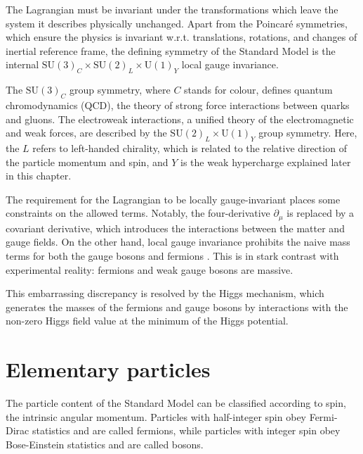 The Lagrangian must be invariant under the transformations which leave the
system it describes physically unchanged. Apart from the Poincar\'e symmetries, which
ensure the physics is invariant w.r.t. translations, rotations, and changes of inertial
reference frame, the defining symmetry of the Standard Model is the internal
$\text{SU}(3)_C \times \text{SU}(2)_L \times \text{U}(1)_Y$ local gauge invariance.

The $\text{SU}(3)_C$ group symmetry, where $C$ stands for colour, defines quantum chromodynamics
(QCD), the theory of strong force interactions between quarks and gluons. The electroweak
interactions, a unified theory of the electromagnetic and weak forces, are described by
the $\text{SU}(2)_L \times \text{U}(1)_Y$ group symmetry. Here, the $L$ refers to left-handed
chirality, which is related to the relative direction of the particle momentum and spin, and
$Y$ is the weak hypercharge \cite{Thomson:2013zua} explained later in this chapter.

The requirement for the Lagrangian to be locally gauge-invariant places some constraints
on the allowed terms. Notably, the four-derivative $\partial_\mu$ is replaced by a 
covariant derivative, which introduces the interactions between the matter and gauge
fields. On the other hand, local gauge invariance prohibits the naive mass terms for
both the gauge bosons and fermions \cite{Thomson:2013zua}. This is in stark contrast
with experimental reality: fermions and weak gauge bosons are massive.

This embarrassing discrepancy is resolved by the Higgs mechanism, which generates the
masses of the fermions and gauge bosons by interactions with the non-zero Higgs field
value at the minimum of the Higgs potential.

\section{Elementary particles}

The particle content of the Standard Model can be classified according to spin, the
intrinsic angular momentum. Particles with half-integer spin obey Fermi-Dirac statistics
and are called fermions, while particles with integer spin obey Bose-Einstein
statistics and are called bosons.

